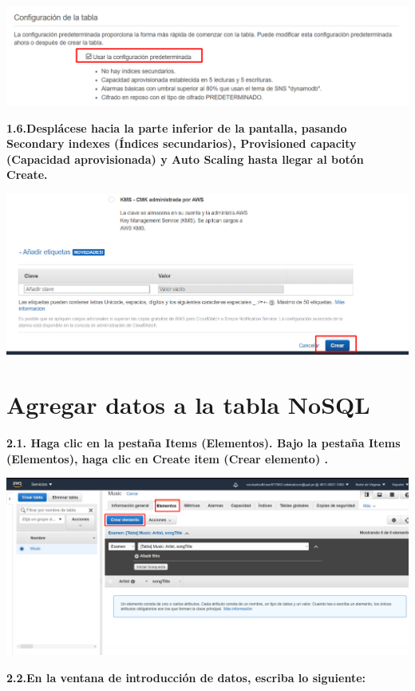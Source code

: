 \documentclass{article}
\begin{document}
    \begin{center}
		\includegraphics[width=15cm]{./images/5} 
	\end{center}
\textbf{1.6.Desplácese hacia la parte inferior de la pantalla, pasando Secondary indexes (Índices secundarios), Provisioned capacity (Capacidad aprovisionada) y Auto Scaling hasta llegar al botón Create. 
}

    \begin{center}
		\includegraphics[width=15cm]{./images/6.} 
	\end{center}

\newpage

\section{Agregar datos a la tabla NoSQL }

\textbf{2.1. Haga clic en la pestaña Items (Elementos). Bajo la pestaña Items (Elementos), haga clic en Create item (Crear elemento) . }

    \begin{center}
		\includegraphics[width=15cm]{./images/7} 
	\end{center}
	\newpage
\textbf{2.2.En la ventana de introducción de datos, escriba lo siguiente: }
\end{document}
